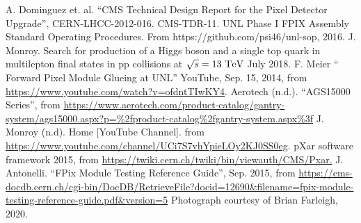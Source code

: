 \documentclass[print]{nuthesis}
\begin{document}
\begin{thebibliography}{300}
 A. Dominguez et. al. ``CMS Technical Design Report for the Pixel Detector Upgrade'', CERN-LHCC-2012-016. CMS-TDR-11.
 UNL Phase I FPIX Assembly Standard Operating Procedures. From {https://github.com/psi46/unl-sop}, 2016.
 J. Monroy. Search for production of a Higgs boson and a single top quark in multilepton final states in \MakeLowercase{pp} collisions at ${\sqrt{\MakeLowercase{s}}=\textrm{13 T\MakeLowercase{e}V}}$ July 2018.
 F. Meier `` Forward Pixel Module Glueing at UNL'' YouTube, Sep. 15, 2014, from \url{https://www.youtube.com/watch?v=ofdntTIwKY4}.
 Aerotech (n.d.). ``AGS15000 Series'', from \url{https://www.aerotech.com/product-catalog/gantry-system/ags15000.aspx?p=\%2fproduct-catalog\%2fgantry-system.aspx\%3f}
 J. Monroy (n.d). Home [YouTube Channel]. from \url{https://www.youtube.com/channel/UCi7S7vhYpieLOy2KJ0SS0eg}.
 pXar software framework 2015, from \url{ https://twiki.cern.ch/twiki/bin/viewauth/CMS/Pxar.}
 J. Antonelli. ``FPix Module Testing Reference Guide'', Sep. 2015, from \url{https://cms-docdb.cern.ch/cgi-bin/DocDB/RetrieveFile?docid=12690&filename=fpix-module-testing-reference-guide.pdf&version=5}
 Photograph courtesy of Brian Farleigh, 2020.









\end{thebibliography}
\end{document}
